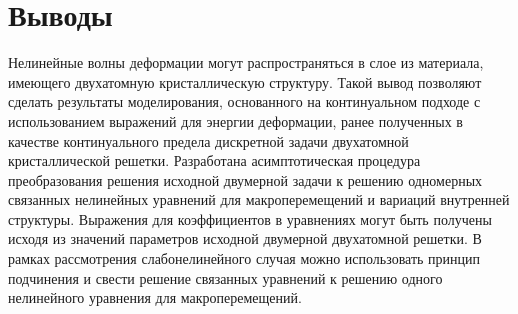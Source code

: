 \section{Выводы}

Нелинейные волны деформации могут распространяться в слое из материала, имеющего двухатомную кристаллическую структуру. Такой вывод позволяют сделать результаты моделирования, основанного на континуальном подходе с использованием выражений для энергии деформации, ранее полученных в качестве континуального предела дискретной задачи двухатомной кристаллической решетки. Разработана асимптотическая процедура преобразования решения исходной двумерной задачи к решению одномерных связанных нелинейных уравнений для макроперемещений и вариаций внутренней структуры. Выражения для коэффициентов в уравнениях могут быть получены исходя из значений параметров исходной двумерной двухатомной решетки. В рамках рассмотрения слабонелинейного случая можно использовать принцип подчинения и свести решение связанных уравнений к решению одного нелинейного уравнения для макроперемещений.

